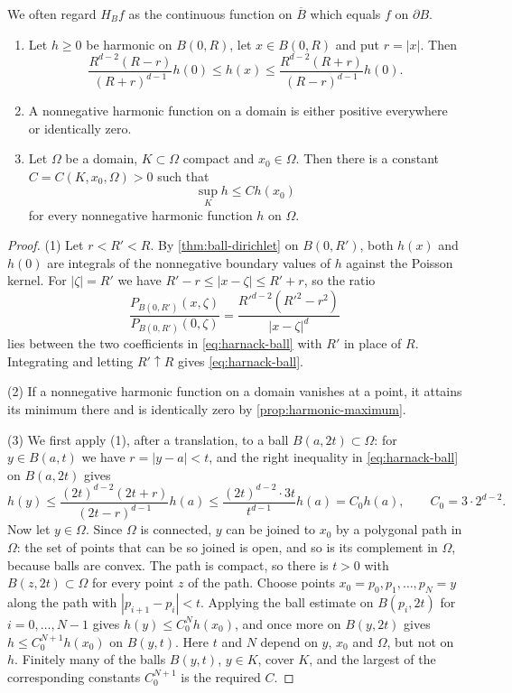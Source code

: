 We often regard $H_Bf$ as the continuous function on $\overline B$ which equals $f$ on $\partial B$.

\begin{proposition}\label{prop:harnack-ball}
\begin{enumerate}
\item Let $h\geq0$ be harmonic on $B(0,R)$, let $x\in B(0,R)$ and put $r=|x|$. Then
\begin{equation}\label{eq:harnack-ball}
 \frac{R^{d-2}(R-r)}{(R+r)^{d-1}}h(0)
 \leq h(x)\leq
 \frac{R^{d-2}(R+r)}{(R-r)^{d-1}}h(0).
\end{equation}
\item A nonnegative harmonic function on a domain is either positive everywhere or identically zero.
\item Let $\Omega$ be a domain, $K\subset\Omega$ compact and $x_0\in\Omega$. Then there is a constant $C=C(K,x_0,\Omega)>0$ such that
\[
 \sup_K h\leq C h(x_0)
\]
for every nonnegative harmonic function $h$ on $\Omega$.
\end{enumerate}
\end{proposition}
\begin{proof}
(1) Let $r<R'<R$. By \cref{thm:ball-dirichlet} on $B(0,R')$, both $h(x)$ and $h(0)$ are integrals of the nonnegative boundary values of $h$ against the Poisson kernel. For $|\zeta|=R'$ we have $R'-r\leq|x-\zeta|\leq R'+r$, so the ratio
\[
 \frac{P_{B(0,R')}(x,\zeta)}{P_{B(0,R')}(0,\zeta)}=\frac{R'^{d-2}(R'^2-r^2)}{|x-\zeta|^d}
\]
lies between the two coefficients in \eqref{eq:harnack-ball} with $R'$ in place of $R$. Integrating and letting $R'\uparrow R$ gives \eqref{eq:harnack-ball}.

(2) If a nonnegative harmonic function on a domain vanishes at a point, it attains its minimum there and is identically zero by \cref{prop:harmonic-maximum}.

(3) We first apply (1), after a translation, to a ball $B(a,2t)\subset\Omega$: for $y\in B(a,t)$ we have $r=|y-a|<t$, and the right inequality in \eqref{eq:harnack-ball} on $B(a,2t)$ gives
\[
 h(y)\leq\frac{(2t)^{d-2}(2t+r)}{(2t-r)^{d-1}}h(a)\leq\frac{(2t)^{d-2}\cdot3t}{t^{d-1}}h(a)=C_0h(a),\qquad C_0=3\cdot2^{d-2}.
\]
Now let $y\in\Omega$. Since $\Omega$ is connected, $y$ can be joined to $x_0$ by a polygonal path in $\Omega$: the set of points that can be so joined is open, and so is its complement in $\Omega$, because balls are convex. The path is compact, so there is $t>0$ with $B(z,2t)\subset\Omega$ for every point $z$ of the path. Choose points $x_0=p_0,p_1,\ldots,p_N=y$ along the path with $|p_{i+1}-p_i|<t$. Applying the ball estimate on $B(p_i,2t)$ for $i=0,\ldots,N-1$ gives $h(y)\leq C_0^Nh(x_0)$, and once more on $B(y,2t)$ gives $h\leq C_0^{N+1}h(x_0)$ on $B(y,t)$. Here $t$ and $N$ depend on $y$, $x_0$ and $\Omega$, but not on $h$. Finitely many of the balls $B(y,t)$, $y\in K$, cover $K$, and the largest of the corresponding constants $C_0^{N+1}$ is the required $C$.
\end{proof}

